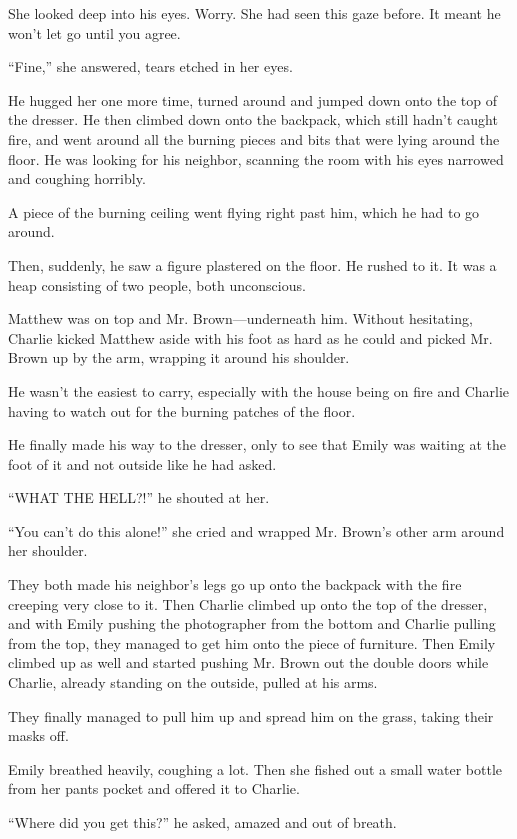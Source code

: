 She looked deep into his eyes. Worry. She had seen this gaze before. It meant he won't let go until you agree.

“Fine,” she answered, tears etched in her eyes.

He hugged her one more time, turned around and jumped down onto the top of the dresser. He then climbed down onto the backpack, which still hadn't caught fire, and went around all the burning pieces and bits that were lying around the floor. He was looking for his neighbor, scanning the room with his eyes narrowed and coughing horribly.

A piece of the burning ceiling went flying right past him, which he had to go around.

Then, suddenly, he saw a figure plastered on the floor. He rushed to it. It was a heap consisting of two people, both unconscious.

Matthew was on top and Mr. Brown—underneath him. Without hesitating, Charlie kicked Matthew aside with his foot as hard as he could and picked Mr. Brown up by the arm, wrapping it around his shoulder.

He wasn't the easiest to carry, especially with the house being on fire and Charlie having to watch out for the burning patches of the floor.

He finally made his way to the dresser, only to see that Emily was waiting at the foot of it and not outside like he had asked.

“WHAT THE HELL?!” he shouted at her.

“You can't do this alone!” she cried and wrapped Mr. Brown's other arm around her shoulder.

They both made his neighbor's legs go up onto the backpack with the fire creeping very close to it. Then Charlie climbed up onto the top of the dresser, and with Emily pushing the photographer from the bottom and Charlie pulling from the top, they managed to get him onto the piece of furniture. Then Emily climbed up as well and started pushing Mr. Brown out the double doors while Charlie, already standing on the outside, pulled at his arms.

They finally managed to pull him up and spread him on the grass, taking their masks off.

Emily breathed heavily, coughing a lot. Then she fished out a small water bottle from her pants pocket and offered it to Charlie.

“Where did you get this?” he asked, amazed and out of breath.

